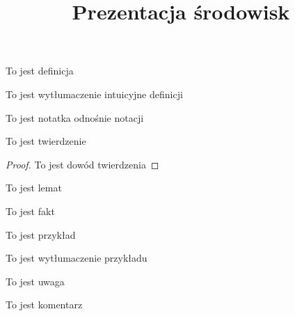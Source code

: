 \documentclass[a4paper,12pt]{article}
\title{\Huge{Prezentacja środowisk}}
\author{}
\date{}
\begin{document}
\maketitle


\begin{definition}
    To jest definicja
\end{definition}

\begin{intuitive}
    To jest wytłumaczenie intuicyjne definicji 
\end{intuitive}

\begin{notation}
    To jest notatka odnośnie notacji
\end{notation}

\begin{theorem}
    To jest twierdzenie
\end{theorem}
\begin{proof}
    To jest dowód twierdzenia
\end{proof}

\begin{lemma}
    To jest lemat
\end{lemma}

\begin{fact}
    To jest fakt 
\end{fact}

\begin{example}
    To jest przykład
\end{example}
\begin{explanation}
    To jest wytłumaczenie przykładu
\end{explanation}

\begin{remark}
    To jest uwaga
\end{remark}

\begin{note}
    To jest komentarz
\end{note}

\end{document}
